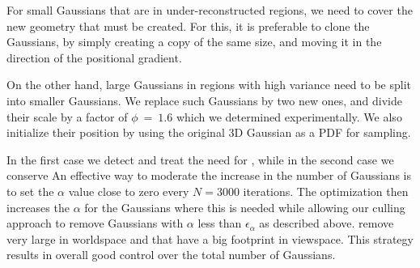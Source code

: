 For small Gaussians that are in under-reconstructed regions, we need to cover the new geometry that must be created.
For this, it is preferable to clone the Gaussians, by simply creating a copy of the same size, and moving it in the direction of the positional gradient.

On the other hand, large Gaussians in regions with high variance need to be split into smaller Gaussians. We replace such Gaussians by two new ones, and divide their scale by a factor of $\phi~=~1.6$ which we determined experimentally.
We also initialize their position by
using the original 3D Gaussian as a PDF for sampling.


In the first case we detect and treat the need for , while in the second case we conserve 
An effective way to moderate the increase in the number of Gaussians  is to set the $\alpha$ value close to zero every $N=3000$ iterations. The optimization then increases the $\alpha$ for the Gaussians where this is needed while allowing our culling approach to remove Gaussians with $\alpha$ less than $\epsilon_{\alpha}$ as described above.  remove  very large  in worldspace and  that have a big footprint in viewspace. This strategy results in overall good control over the total number of Gaussians. 
